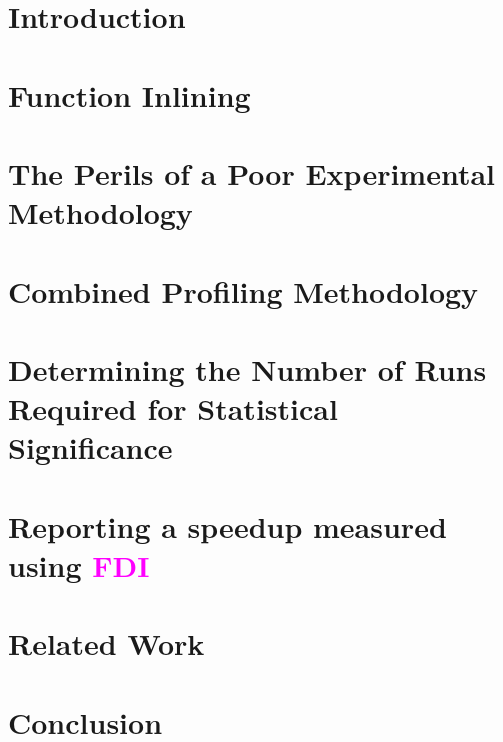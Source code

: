 \documentclass[conference]{IEEEtran}
\renewcommand{\ifColorText}[2]{\textcolor{#1}{#2}}  %
\def\FDI{{\ifColorText{Magenta}{FDI}}}
\begin{document}
\section{Introduction}
	\label{sec:intro}
	

\section{Function Inlining}
	\label{sec:inlining}
	

\section{The Perils of a Poor Experimental Methodology}
	\label{sec:description}
	

\section{Combined Profiling Methodology}
	\label{sec:cmbprof}
	
	
\section{Determining the Number of Runs Required for Statistical Significance}
	\label{sec:robust}
	
	
\section{Reporting a speedup measured using \FDI\ }
	\label{sec:speedup}
	





\section{Related Work}
	\label{sec:related}
	

\section{Conclusion}
	\label{sec:conclusion}
	

%	

%


\end{document}
